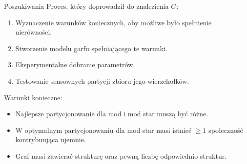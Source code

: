 \documentclass{beamer}
\begin{document}
\begin{frame}{Poszukiwania}
    Proces, który doprowadził do znalezienia \(G\):
    \begin{enumerate}
        \item Wyznaczenie warunków koniecznych, aby możliwe było spełnienie nierówności.
        \item Stworzenie modelu garfu spełniającego te warunki.
        \item Eksperymentalne dobranie parametrów.
        \item Testowanie sensownych partycji zbioru jego wierzchołków.
    \end{enumerate}
    \vspace{0.5cm}
    Warunki konieczne:
    \begin{itemize}
        \item Najlepsze partycjonowanie dla mod i mod star muszą być różne.
        \item W optymalnym partycjonowaniu dla mod star musi istnieć \(\geq 1\) społeczność kontrybuująca ujemnie.
        \item Graf musi zawierać  strukturę oraz pewną liczbę odpowiednio  struktur.
    \end{itemize}
\end{frame}
\end{document}
